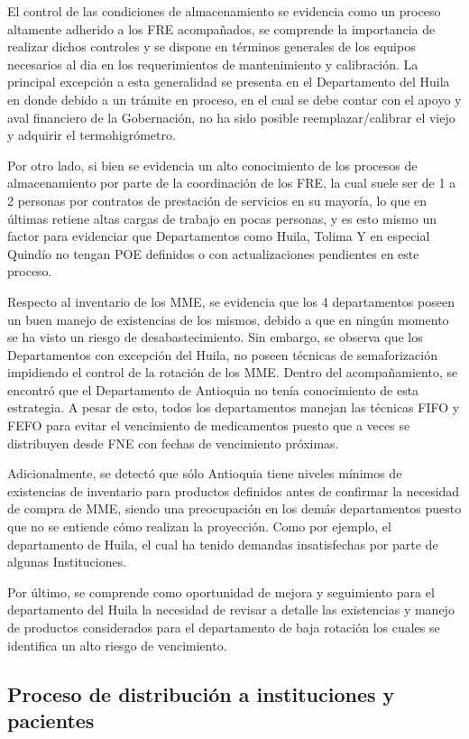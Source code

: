 \documentclass[
]{book}
\begin{document}
El control de las condiciones de almacenamiento se evidencia como un proceso altamente adherido a los FRE acompañados, se comprende la importancia de realizar dichos controles y se dispone en términos generales de los equipos necesarios al dia en los requerimientos de mantenimiento y calibración. La principal excepción a esta generalidad se presenta en el Departamento del Huila en donde debido a un trámite en proceso, en el cual se debe contar con el apoyo y aval financiero de la Gobernación, no ha sido posible reemplazar/calibrar el viejo y adquirir el termohigrómetro.

Por otro lado, si bien se evidencia un alto conocimiento de los procesos de almacenamiento por parte de la coordinación de los FRE, la cual suele ser de 1 a 2 personas por contratos de prestación de servicios en su mayoría, lo que en últimas retiene altas cargas de trabajo en pocas personas, y es esto mismo un factor para evidenciar que Departamentos como Huila, Tolima Y en especial Quindío no tengan POE definidos o con actualizaciones pendientes en este proceso.

Respecto al inventario de los MME, se evidencia que los 4 departamentos poseen un buen manejo de existencias de los mismos, debido a que en ningún momento se ha visto un riesgo de desabastecimiento. Sin embargo, se observa que los Departamentos con excepción del Huila, no poseen técnicas de semaforización impidiendo el control de la rotación de los MME. Dentro del acompañamiento, se encontró que el Departamento de Antioquia no tenía conocimiento de esta estrategia. A pesar de esto, todos los departamentos manejan las técnicas FIFO y FEFO para evitar el vencimiento de medicamentos puesto que a veces se distribuyen desde FNE con fechas de vencimiento próximas.

Adicionalmente, se detectó que sólo Antioquia tiene niveles mínimos de existencias de inventario para productos definidos antes de confirmar la necesidad de compra de MME, siendo una preocupación en los demás departamentos puesto que no se entiende cómo realizan la proyección. Como por ejemplo, el departamento de Huila, el cual ha tenido demandas insatisfechas por parte de algunas Instituciones.

Por último, se comprende como oportunidad de mejora y seguimiento para el departamento del Huila la necesidad de revisar a detalle las existencias y manejo de productos considerados para el departamento de baja rotación los cuales se identifica un alto riesgo de vencimiento.

\hypertarget{proceso-de-distribuciuxf3n-a-instituciones-y-pacientes-1}{%
\subsection{Proceso de distribución a instituciones y pacientes}\label{proceso-de-distribuciuxf3n-a-instituciones-y-pacientes-1}}
\end{document}
